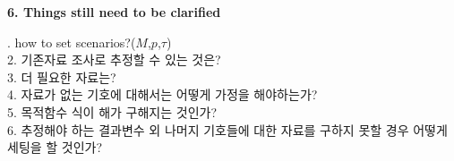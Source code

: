 \documentclass[11pt,a4paper]{article}
\newcommand{\blocktitle}[1]{\par\bigskip\noindent\textbf{\large #1}\par\smallskip}
\begin{document}

\blocktitle{6. Things still need to be clarified}
1. how to set scenarios?($M$,$p$,$\tau$) \\
2. 기존자료 조사로 추정할 수 있는 것은? \\
3. 더 필요한 자료는? \\
4. 자료가 없는 기호에 대해서는 어떻게 가정을 해야하는가? \\
5. 목적함수 식이 해가 구해지는 것인가? \\
6. 추정해야 하는 결과변수 외 나머지 기호들에 대한 자료를 구하지 못할 경우 어떻게 세팅을 할 것인가? \\
\end{document}
